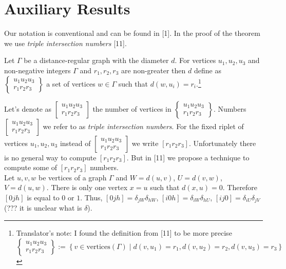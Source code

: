 \documentclass{article}
\theoremstyle{definition}
\theoremstyle{definition}
\theoremstyle{remark}
\begin{document}
\section{Auxiliary Results}

Our notation is conventional and can be found in [1]. In the proof of the theorem we use {\it triple intersection numbers} [11].

Let $\Gamma$ be a distance-regular graph with the diameter $d$. For vertices $u_1, u_2, u_3$ and non-negative integers $\Gamma$ and $r_1, r_2, r_3$ are non-greater then $d$ define as
$ \begin{Bmatrix}
    u_1 u_2 u_3 \\
    r_1 r_2 r_3
\end{Bmatrix}$ a set of vertices $w \in \Gamma$ such that $d(w, u_i) = r_i$.\footnote{Translator's note: I found the definition from [11] to be more precise
\[
\begin{Bmatrix}
    u_1 u_2 u_3 \\
    r_1 r_2 r_3
\end{Bmatrix} := \left\{ v \in \text{vertices}(\Gamma) \mid d(v, u_1) = r_1, d(v, u_2) = r_2, d(v, u_3) = r_3 \right\}
\]

}

Let's denote as
$\begin{bmatrix}
    u_1 u_2 u_3 \\
    r_1 r_2 r_3
\end{bmatrix}$ the number of vertices in
$\begin{Bmatrix}
    u_1 u_2 u_3 \\
    r_1 r_2 r_3
\end{Bmatrix}$. Numbers
$\begin{bmatrix}
    u_1 u_2 u_3 \\
    r_1 r_2 r_3
\end{bmatrix}$
we refer to as {\it triple intersection numbers}. For the fixed riplet of vertices $u_1,u_2,u_3$ instead of
$\begin{bmatrix}
    u_1 u_2 u_3 \\
    r_1 r_2 r_3
\end{bmatrix}$ we write
$[r_1 r_2 r_3]$.
Unfortunately there is no general way to compute $[r_1 r_2 r_3]$. But in [11] we propose a technique to compute some of $[r_1 r_2 r_3]$ numbers.
\\

Let $u,v,w$ be vertices of a graph $\Gamma$ and $W = d(u,v)$, $U = d(v,w)$, $V = d(u,w)$. There is only one vertex $x = u$ such that $d(x,u) = 0$. Therefore $[0jh]$ is equal to $0$ or $1$. Thus, $[0jh] = \delta_{jW}\delta_{hW}$, $[i0h] = \delta_{iW}\delta_{hU}$, $[ij0] = \delta_{iU}\delta_{jV}$ (??? it is unclear what is $\delta$).
\end{document}
